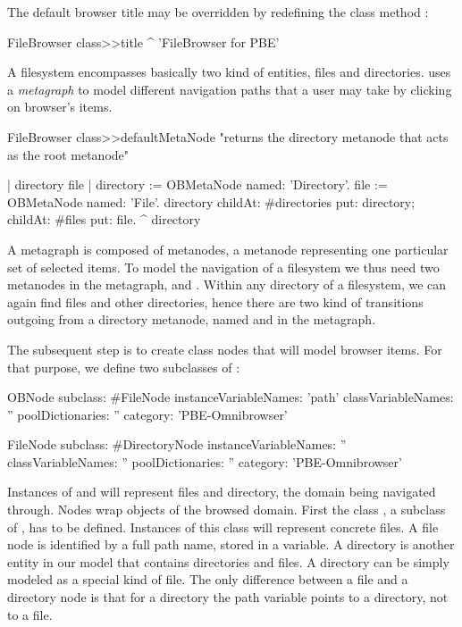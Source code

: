 \documentclass[a4paper,10pt,twoside]{book}
\begin{document}
The default browser title may be overridden by redefining the class method :

\begin{code}{}
FileBrowser class>>title
	^ 'FileBrowser for PBE'
\end{code}


A filesystem encompasses basically two kind of entities, files and directories. 
\ob uses a \emph{metagraph} to model different navigation paths that a user may take by clicking on browser's items. 

\begin{code}{}
FileBrowser class>>defaultMetaNode
     "returns the directory metanode that acts as the root metanode"
 
     | directory file |
     directory := OBMetaNode named: 'Directory'.
     file := OBMetaNode named: 'File'.
     directory 
          childAt: #directories put: directory;
          childAt: #files put: file.
     ^ directory
\end{code}

A metagraph is composed of metanodes, a metanode representing one particular set of selected items.
To model the navigation of a filesystem we thus need two metanodes in the metagraph,  and . Within any directory of a filesystem, we can again find files and other directories, hence there are two kind of transitions outgoing from a directory metanode, named  and  in the metagraph. 

The subsequent step is to create class nodes that will model browser items. For that purpose, we define two subclasses of :

\begin{code}{}
OBNode subclass: #FileNode
	instanceVariableNames: 'path'
	classVariableNames: ''
	poolDictionaries: ''
	category: 'PBE-Omnibrowser'

FileNode subclass: #DirectoryNode
	instanceVariableNames: ''
	classVariableNames: ''
	poolDictionaries: ''
	category: 'PBE-Omnibrowser'
\end{code}

Instances of  and  will represent files and directory, the domain being navigated through. 
Nodes wrap objects of the browsed domain. First the class , a subclass of , has to be defined. Instances of this class will represent concrete files. A file node is identified by a full path name, stored in a variable. A directory is another entity in our model that contains directories and files. A directory can be simply modeled as a special kind of file. The only difference between a file and a directory node is that for a directory the path variable points to a directory, not to a file. 
\end{document}
